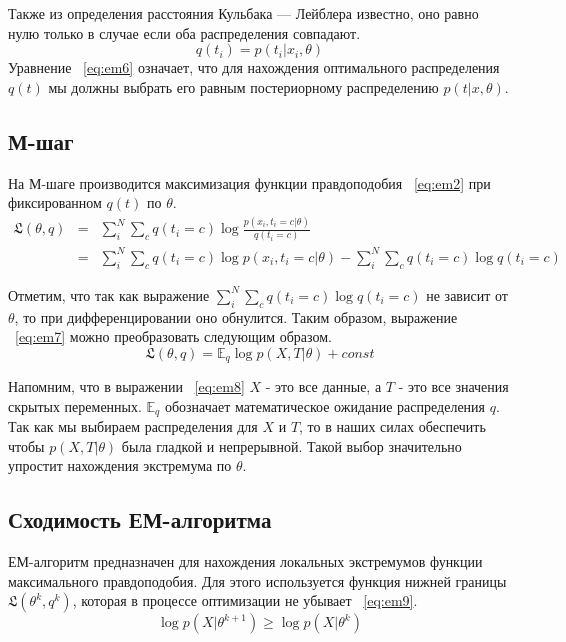 Также из определения расстояния Кульбака — Лейблера известно, оно равно нулю только в случае если оба распределения совпадают. 
\begin{equation} \label{eq:em6}
 q(t_i)  =  p \left( t_i \vert x_i, \theta \right) 
\end{equation}
Уравнение ~\ref{eq:em6}  означает, что для нахождения оптимального распределения $q(t)$ мы должны выбрать его равным постериорному распределению $p \left( t \vert x,\theta \right)$.

\subsection{М-шаг}
На М-шаге производится максимизация функции правдоподобия ~\ref{eq:em2} при фиксированном $q(t)$ по $\theta$.
\begin{eqnarray*} \label{eq:em7}
\mathfrak{L}(\theta, q) & = &  \sum_i^N \sum_c q(t_i = c) \log \frac{p \left( x_i, t_i = c \vert \theta \right)}{q(t_i = c)} \\
& = &  \sum_i^N \sum_c q(t_i = c) \log p \left( x_i, t_i = c \vert \theta \right) - \sum_i^N \sum_c q(t_i = c) \log {q(t_i = c)} 
\end{eqnarray*}

Отметим, что так как выражение $\sum_i^N \sum_c q(t_i = c) \log  {q(t_i = c)}$ не зависит от $\theta$, то при дифференцировании оно обнулится. 
Таким образом, выражение ~\ref{eq:em7}  можно преобразовать следующим образом.
\begin{equation} \label{eq:em8}
\mathfrak{L}(\theta, q)  = \mathbb{E}_{q}\log p \left( X,T \vert \theta \right) + const
\end{equation}

Напомним, что в выражении ~\ref{eq:em8} $X$ - это все данные, а $T$ - это все значения скрытых переменных. $\mathbb{E}_{q}$ обозначает математическое ожидание распределения $q$. Так как мы выбираем распределения для $X$ и $T$, то в наших силах обеспечить чтобы $ p \left( X,T \vert \theta \right)$ была гладкой и непрерывной. Такой выбор значительно упростит нахождения экстремума по $\theta$.

\subsection{Сходимость ЕМ-алгоритма}
ЕМ-алгоритм предназначен для нахождения локальных экстремумов функции максимального правдоподобия. 
Для этого используется функция нижней границы $\mathfrak{L}(\theta^k, q^k)$, которая в процессе оптимизации не убывает ~\ref{eq:em9}. 
\begin{equation} \label{eq:em9}
\log p (X \vert  \theta ^{k+1} ) \geqslant \log p (X \vert  \theta ^{k} )
\end{equation}

